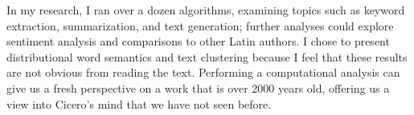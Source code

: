 \documentclass[a4paper, 12pt,notitlepage]{article} %
\numberwithin{dummy}{subsection}
\numberwithin{dummy}{section}
\theoremstyle{named}
\theoremstyle{definition}
\theoremstyle{definition}
\begin{document}
 In my research, I ran over a dozen algorithms, examining topics such as keyword extraction, summarization, and text generation; further analyses could explore sentiment analysis and comparisons to other Latin authors. I chose to present distributional word semantics and text clustering because I feel that these results are not obvious from reading the text. Performing a computational analysis can give us a fresh perspective on a work that is over 2000 years old, offering us a view into Cicero's mind that we have not seen before.

\pagebreak

\setcounter{section}{\thesection + 1}
\def\enotesize{\normalsize} 
\theendnotes

\pagebreak

\setcounter{section}{\thesection + 1}




%	
	
	
	

	
\end{document}
